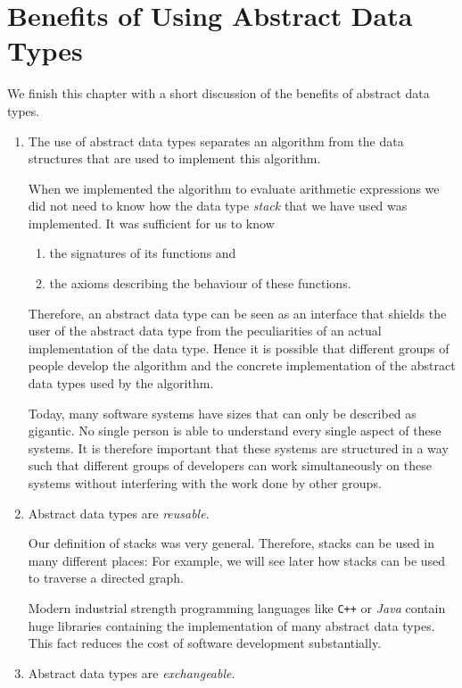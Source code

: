 \section[Benefits of Abstract Data Types]{Benefits of Using Abstract Data Types}
We finish this chapter with a short discussion of the benefits of abstract data types.
 \begin{enumerate}
 \item The use of abstract data types separates an algorithm from the data structures that
       are used to implement this algorithm.

       When we implemented the algorithm to evaluate arithmetic expressions we did not need to know
       how the data type \emph{stack} that we have used was implemented.  It was sufficient for us to know 
       \begin{enumerate}
       \item the signatures of its functions and
       \item the axioms describing the behaviour of these functions.
       \end{enumerate}
       Therefore, an abstract data type can be seen as an interface that shields the user of the
       abstract data type from the peculiarities of an actual implementation of the data type.
       Hence it is possible that different groups of people develop the algorithm and the
       concrete implementation of the abstract data types used by the algorithm.  

       Today, many software systems have sizes that can only be described as gigantic.  No single
       person is able to understand every single aspect of these systems.  It is therefore important
       that these systems are structured in a way such that different groups of developers can work
       simultaneously on these systems without interfering with the work done by other groups.
 \item Abstract data types are \emph{reusable}.

       Our definition of stacks was very general.  Therefore, stacks can be used in many different
       places:  For example, we will see later how stacks can be used to traverse a directed graph.

       Modern industrial strength programming languages like \texttt{C++} or \textsl{Java} contain
       huge libraries containing the implementation of many abstract data types.  This fact reduces
       the cost of software development substantially.     
 \item Abstract data types are \emph{exchangeable}.


\end{enumerate}
